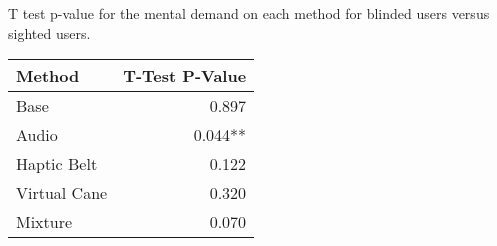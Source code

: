 
\centering
\caption{T test p-value for the mental demand on each method for blinded users versus sighted users.}
\label{tab:ttest_mental_demand}
\begin{tabular}{lr}
\toprule
      Method & T-Test P-Value \\
\midrule
        Base &          0.897 \\
       Audio &        0.044** \\
 Haptic Belt &          0.122 \\
Virtual Cane &          0.320 \\
     Mixture &          0.070 \\
\bottomrule
\end{tabular}
